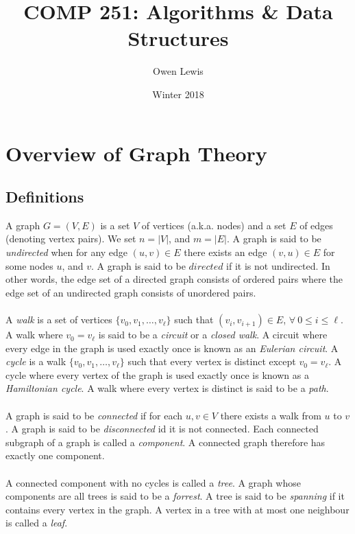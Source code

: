 \documentclass{article}
\title{COMP 251: Algorithms \& Data Structures}
\author{Owen Lewis}
\date{Winter 2018}
\newcommand{\ti}[1]{\textit{#1}}
\begin{document}
\begin{titlepage}
\maketitle
\end{titlepage}

\tableofcontents
\newpage


\section{Overview of Graph Theory}
\subsection{Definitions}
A graph $G = (V, E)$ is a set $V$ of vertices (a.k.a. nodes) and a set $E$ of edges (denoting vertex pairs). We set $n = |V|$, and $m = |E|$. A graph is said to be \ti{undirected} when for any edge $(u, v) \in E$ there exists an edge $(v, u) \in E$ for some nodes $u$, and $v$. A graph is said to be $\ti{directed}$ if it is not undirected. In other words, the edge set of a directed graph consists of ordered pairs where the edge set of an undirected graph consists of unordered pairs.\\\\
A \ti{walk} is a set of vertices $\{v_0, v_1, \dots, v_{\ell}\}$ such that $(v_i, v_{i+1}) \in E$, $\forall\ 0 \leq i \leq \ell$. 
A walk where $v_0 = v_{\ell}$ is said to be a \ti{circuit} or a \ti{closed walk}.
A circuit where every edge in the graph is used exactly once is known as an \ti{Eulerian circuit}. 
A \ti{cycle} is a walk $\{v_0, v_1, \dots, v_{\ell}\}$ such that every vertex is distinct except $v_0 = v_{\ell}$.
A cycle where every vertex of the graph is used exactly once is known as a \ti{Hamiltonian cycle}.
A walk where every vertex is distinct is said to be a \ti{path}.\\\\
A graph is said to be \ti{connected} if for each $u, v \in V$ there exists a walk from $u$ to $v$.
A graph is said to be \ti{disconnected} id it is not connected.
Each connected subgraph of a graph is called a \ti{component}. A connected graph therefore has exactly one component.\\\\
A connected component with no cycles is called a \ti{tree}. A graph whose components are all trees is said to be a \ti{forrest}. A tree is said to be \ti{spanning} if it contains every vertex in the graph. A vertex in a tree with at most one neighbour is called a \ti{leaf}.\\\\
\end{document}
